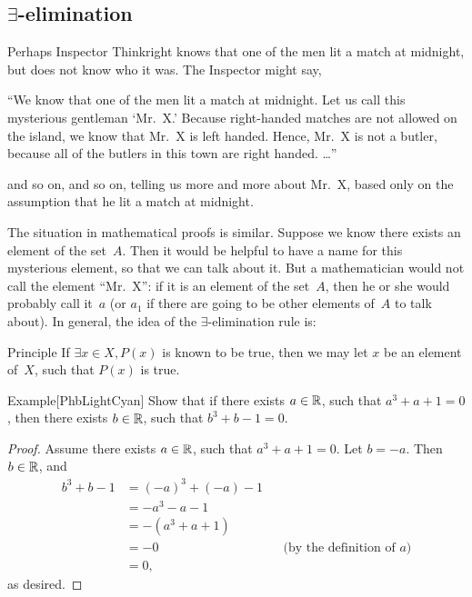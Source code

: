 \documentclass[../MATH-2000-Notes.tex]{subfiles}
\begin{document}
\subsection{\texorpdfstring{$\exists$}{}-elimination}
Perhaps Inspector Thinkright knows that one of the men lit a match at midnight, but does not know who it was. The Inspector might say,
\begin{quotebox}
``We know that one of the men lit a match at midnight. Let us call this mysterious gentleman `Mr.~X\rlap.' Because right-handed matches are not allowed on the island, we know that Mr.~X is left handed. Hence, Mr.~X is not a butler, because all of the butlers in this town are right handed. \dots''
\end{quotebox}
and so on, and so on, telling us more and more about Mr.~X, based only on the assumption that he lit a match at midnight.

The situation in mathematical proofs is similar. Suppose we know there exists an element of the set~$A$. Then it would be helpful to have a name for this mysterious element, so that we can talk about it. But a mathematician would not call the element ``Mr.~X'': if it is an element of the set~$A$, then he or she would probably call it~$a$ (or $a_1$ if there are going to be other elements of~$A$ to talk about).  In general, the idea of the $\exists$-elimination rule is:
\begin{paperbox}{Principle}
    If $\exists x \in X, P(x)$ is known to be true, then we may let $x$ be an element of~$X$, such that $P(x)$ is true.
\end{paperbox}
\begin{commentbox}{Example}[{PhbLightCyan}]
    Show that if there exists $a \in \mathbb{R}$, such that $a^3 + a + 1 = 0$, then there exists $b \in \mathbb{R}$, such that $b^3 + b - 1 = 0$.
\end{commentbox} 
\begin{proof}
    Assume there exists $a \in \mathbb{R}$, such that $a^3 + a + 1 = 0$. Let $b = -a$. Then $b \in \mathbb{R}$, and
	\begin{align*}
	 b^3 + b - 1
	&= (-a)^3 + (-a) - 1
	\\&= -a^3 - a - 1
	\\&= -(a^3 + a + 1)
	\\&= -0 
	&& \text{(by the definition of~$a$)}
	\\&= 0
	, \end{align*}
    as desired.
\end{proof}
\end{document}
